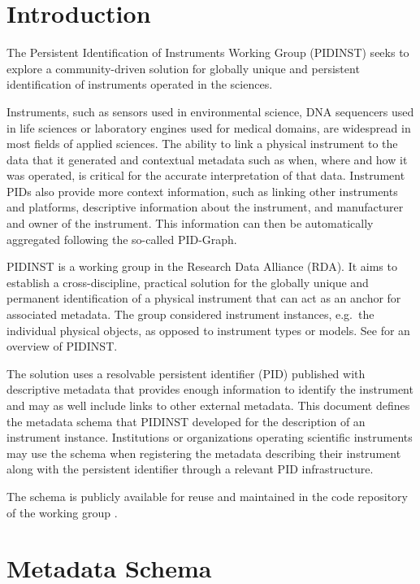 \documentclass[titlepage=true,twoside=false,DIV=13]{scrartcl}
\begin{document}
\section{Introduction}
\label{intro}

The Persistent Identification of Instruments Working Group (PIDINST)
seeks to explore a commu\-nity-driven solution for globally unique and
persistent identification of instruments operated in the sciences.

Instruments, such as sensors used in environmental science, DNA
sequencers used in life sciences or laboratory engines used for
medical domains, are widespread in most fields of applied sciences.
The ability to link a physical instrument to the data that it
generated and contextual metadata such as when, where and how it was
operated, is critical for the accurate interpretation of that data.
Instrument PIDs also provide more context information, such as linking
other instruments and platforms, descriptive information about the
instrument, and manufacturer and owner of the instrument.  This
information can then be automatically aggregated following the
so-called PID-Graph.

PIDINST is a working group in the Research Data Alliance (RDA).  It
aims to establish a cross-discipline, practical solution for the
globally unique and permanent identification of a physical instrument
that can act as an anchor for associated metadata.  The group
considered instrument instances, e.g.\ the individual physical
objects, as opposed to instrument types or models.  See
\cite{pidinst2020} for an overview of PIDINST.

The solution uses a resolvable persistent identifier (PID) published
with descriptive metadata that provides enough information to identify
the instrument and may as well include links to other external
metadata.  This document defines the metadata schema that PIDINST
developed for the description of an instrument instance.  Institutions
or organizations operating scientific instruments may use the schema
when registering the metadata describing their instrument along with
the persistent identifier through a relevant PID infrastructure.

The schema is publicly available for reuse and maintained in the code
repository of the working group \cite{pidinst:github}.

\section{Metadata Schema}
\label{schema}
\end{document}
